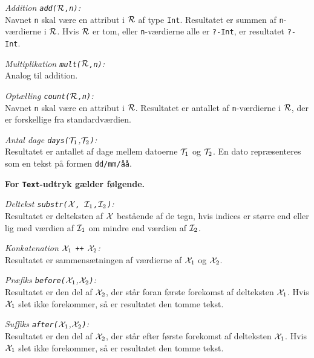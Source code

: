 \documentclass{article}
\newcounter{eks}
\begin{document}
{\em Addition \verb"add("$\cal R$\verb",n)":}\\
Navnet \verb"n" skal v\ae{}re en attribut i $\cal R$ af type \verb"Int".
Resultatet er summen af \verb"n"-v\ae{}rdierne i $\cal R$. Hvis 
$\cal R$ er tom, eller \verb"n"-v\ae{}rdierne alle er \verb"?-Int", er
resultatet \verb"?-Int".

{\em Multiplikation \verb"mult("$\cal R$\verb",n)":}\\
Analog til addition.

{\em Opt\ae{}lling \verb"count("$\cal R$\verb",n)":}\\
Navnet \verb"n" skal v\ae{}re en attribut i $\cal R$.
Resultatet er antallet af \verb"n"-v\ae{}rdierne i $\cal R$, der er
forskellige fra standardv\ae{}rdien.

{\em Antal dage \verb"days("${\cal T}_1$,${\cal T}_2$\verb")":}\\
Resultatet er antallet af dage mellem datoerne ${\cal T}_1$ og ${\cal T}_2$.
En dato repr\ae{}senteres som en tekst p\aa{} formen {\tt dd/mm/\aa{}\aa{}}.

{\bf For \verb"Text"-udtryk g\ae{}lder f\o{}lgende.}

{\em Deltekst \verb"substr("$\cal X$\verb", "${\cal I}_1$\verb","${\cal I}_2$\verb")":}\\
Resultatet er delteksten af $\cal X$ best\aa{}ende af de tegn, hvis
indices er st\o{}rre end eller lig med v\ae{}rdien af 
${\cal I}_1$ om mindre end v\ae{}rdien af ${\cal I}_2$.

{\em Konkatenation ${\cal X}_1$ \verb"++" ${\cal X}_2$:}\\
Resultatet er sammens\ae{}tningen af v\ae{}rdierne af
${\cal X}_1$ og ${\cal X}_2$.

{\em Pr\ae{}fiks \verb"before("${\cal X}_1$,${\cal X}_2$\verb")":}\\
Resultatet er den del af ${\cal X}_2$, der st\aa{}r foran f\o{}rste forekomst af
delteksten ${\cal X}_1$. Hvis ${\cal X}_1$ slet ikke forekommer, s\aa{} er
resultatet den tomme tekst.

{\em Suffiks \verb"after("${\cal X}_1$,${\cal X}_2$\verb")":}\\
Resultatet er den del af ${\cal X}_2$, der st\aa{}r efter f\o{}rste forekomst af
delteksten ${\cal X}_1$. Hvis ${\cal X}_1$ slet ikke forekommer, s\aa{} er
resultatet den tomme tekst.
\end{document}
